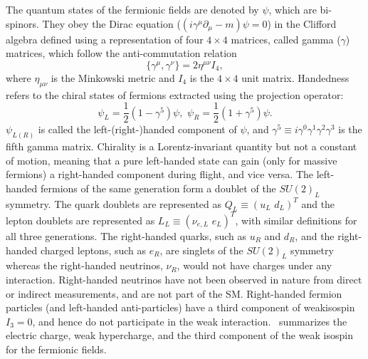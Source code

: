 The quantum states of the fermionic fields are denoted by $\psi$, which are bi-spinors. They obey the Dirac equation ($(i\gamma^\mu \partial_\mu - m)\psi = 0$) in the Clifford algebra defined using a representation of four $4\times4$ matrices, called gamma ($\gamma$) matrices, which follow the anti-commutation relation 
\begin{equation}
    \{\gamma^\mu, \gamma^\nu\}=2\eta^{\mu\nu}I_4,
\end{equation}
where $\eta_{\mu\nu}$ is the Minkowski metric and $I_4$ is the $4\times4$ unit matrix. Handedness refers to the chiral states of fermions extracted using the projection operator:
\begin{equation}
    \psi_L=\frac{1}{2}(1-\gamma^5)\psi,\,\, \psi_R=\frac{1}{2}(1+\gamma^5)\psi.
\end{equation}
$\psi_{L(R)}$ is called the left-(right-)handed component of $\psi$, and $\gamma^5\equiv i\gamma^0\gamma^1\gamma^2\gamma^3$ is the fifth gamma matrix. Chirality is a Lorentz-invariant quantity but not a constant of motion, meaning that a pure left-handed state can gain (only for massive fermions) a right-handed component during flight, and vice versa. The left-handed fermions of the same generation form a doublet of the $SU(2)_L$ symmetry. The quark doublets are represented as $Q_L\equiv (u_L\,\, d_L)^T$ and the lepton doublets are represented as $L_L \equiv (\nu_{e,L}\,\, e_L)^T$, with similar definitions for all three generations. The right-handed quarks, such as $u_R$ and $d_R$, and the right-handed charged leptons, such as $e_R$, are singlets of the $SU(2)_L$ symmetry whereas the right-handed neutrinos, $\nu_R$, would not have charges under any interaction. Right-handed neutrinos have not been observed in nature from direct or indirect measurements, and are not part of the SM. Right-handed fermion particles (and left-handed anti-particles) have a third component of weakisospin $I_3=0$, and hence do not participate in the weak interaction.~ summarizes the electric charge, weak hypercharge, and the third component of the weak isospin for the fermionic fields.


